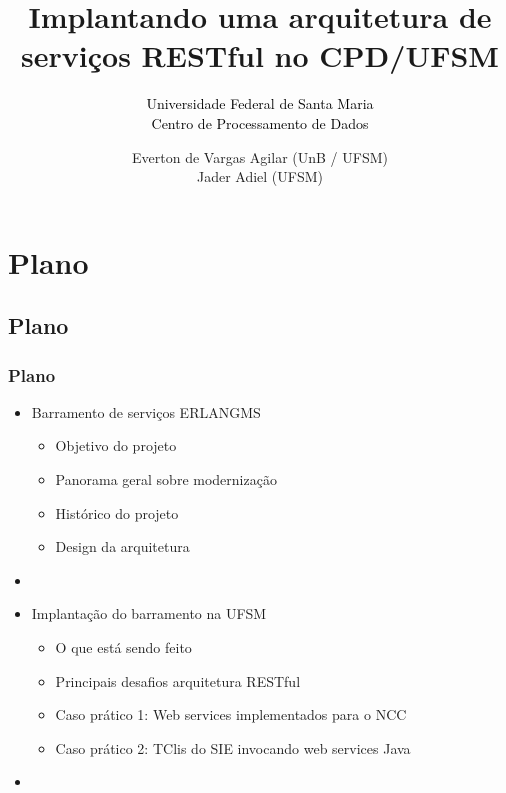 \documentclass{beamer}
\title{Implantando uma arquitetura de serviços RESTful no CPD/UFSM}
\subtitle{ \textcolor{black}{Universidade Federal de Santa Maria} \\
			\textcolor{black}{\small{Centro de Processamento de Dados}} 
}
\author{Everton de Vargas Agilar (UnB / UFSM) \\
		Jader Adiel (UFSM)
}
\begin{document}
\begin{frame}
  \titlepage
\end{frame}





\section{Plano}


\subsection{Plano}

\begin{frame}
  \frametitle{Plano}

    \begin{itemize}

	    \item<1-> Barramento de serviços ERLANGMS
		    \begin{itemize}
		  	  \item<1->Objetivo do projeto
		  	  \item<1->Panorama geral sobre modernização
	    	  \item<1->Histórico do projeto
  	  	 	  \item<1->Design da arquitetura
		    \end{itemize}
	   	  \item<1-> 

	    \item<1-> Implantação do barramento na UFSM
		    \begin{itemize}
			\item<1->O que está sendo feito
			\item<1->Principais desafios arquitetura RESTful
			\item<1->Caso prático 1: Web services implementados para o NCC
			\item<1->Caso prático 2: TClis do SIE invocando web services Java
		    \end{itemize}
   	    \item<1-> 
   	    


	 \end{itemize}	   	  

\end{frame}



\end{document}
